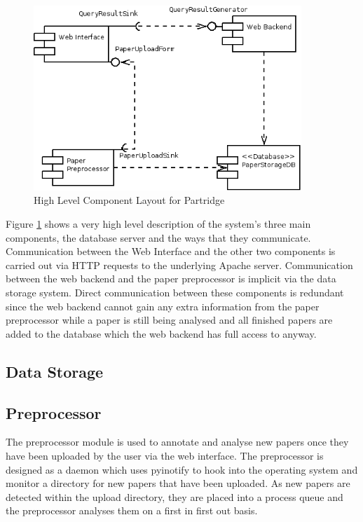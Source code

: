 \begin{figure}[!ht]
\center
\includegraphics[width=0.9\textwidth]{images/design/components_high_level.png}
\caption{High Level Component Layout for Partridge}
\label{fig:high_level_components}
\end{figure}

Figure \ref{fig:high_level_components} shows a very high level description of
the system's three main components, the database server and the ways that they
communicate. Communication between the Web Interface and the other two
components is carried out via HTTP requests to the underlying Apache server.
Communication between the web backend and the paper preprocessor is implicit
via the data storage system. Direct communication between these components is
redundant since the web backend cannot gain any extra information from the
paper preprocessor while a paper is still being analysed and all finished
papers are added to the database which the web backend has full access to
anyway.

\subsection{ Data Storage }

\subsection{ Preprocessor }

The preprocessor module is used to annotate and analyse new papers once they 
have been uploaded by the user via the web interface. The preprocessor is designed 
as a daemon which uses pyinotify to hook into the operating system and monitor a directory 
for new papers that have been uploaded. As new papers are detected within the upload directory, 
they are placed into a process queue and the preprocessor analyses them on a first in first out basis.

